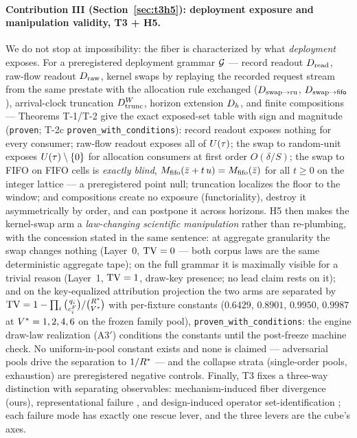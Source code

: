 \paragraph{Contribution III (Section~\ref{sec:t3h5}): deployment exposure
and manipulation validity, T3 + H5.}
We do not stop at impossibility: the fiber is characterized by what
\emph{deployment} exposes. For a preregistered deployment grammar $\mathcal{G}$
--- record readout $D_{\mathrm{read}}$, raw-flow readout $D_{\mathrm{raw}}$, kernel swaps by
replaying the recorded request stream from the same prestate with the
allocation rule exchanged ($D_{\mathrm{swap}\to\mathrm{ru}}$, $D_{\mathrm{swap}\to\mathsf{fifo}}$), arrival-clock
truncation $D_{\mathrm{trunc}}^{W}$, horizon extension $D_{h}$, and finite compositions ---
Theorems T-1/T-2 give the exact exposed-set table with sign and magnitude
(\texttt{proven}; T-2c \texttt{proven\_with\_conditions}): record readout
exposes nothing for every consumer; raw-flow readout exposes all of
$U(\tau)$; the swap to random-unit exposes $U(\tau) \setminus \{0\}$ for
allocation consumers at first order $O(\delta/S)$; the swap to FIFO on FIFO
cells is \emph{exactly blind}, $M_{\mathrm{fifo}}(\bar{z} + t\,u) = M_{\mathrm{fifo}}(\bar{z})$
for all $t \ge 0$ on the integer lattice --- a preregistered point null;
truncation localizes the floor to the window; and compositions create no
exposure (functoriality), destroy it asymmetrically by order, and can
postpone it across horizons. H5 then makes the kernel-swap arm a
\emph{law-changing scientific manipulation} rather than re-plumbing, with
the concession stated in the same sentence: at aggregate granularity the
swap changes nothing (Layer~0, $\operatorname{TV} = 0$ --- both corpus laws are the same
deterministic aggregate tape); on the full grammar it is maximally visible
for a trivial reason (Layer~1, $\operatorname{TV} = 1$, draw-key presence; no lead claim
rests on it); and on the key-equalized attribution projection the two arms
are separated by $\operatorname{TV} = 1 - \prod_i \binom{q_i}{c_i^{F}} /
\binom{R^{*}}{V^{*}}$ with per-fixture constants ($0.6429$, $0.8901$,
$0.9950$, $0.9987$ at $V^{*} = 1, 2, 4, 6$ on the frozen family pool),
\texttt{proven\_with\_conditions}: the engine draw-law realization
(A3$'$) conditions the constants until the post-freeze machine check. No
uniform-in-pool constant exists and none is claimed --- adversarial pools
drive the separation to $1/R^{*}$ --- and the collapse strata (single-order
pools, exhaustion) are preregistered negative controls. Finally, T3 fixes a
three-way distinction with separating observables: mechanism-induced fiber
divergence (ours), representational failure \citep{dolob2026}, and
design-induced operator set-identification
\citep{counterfactualoperator2025}; each failure mode has exactly one
rescue lever, and the three levers are the cube's axes.

